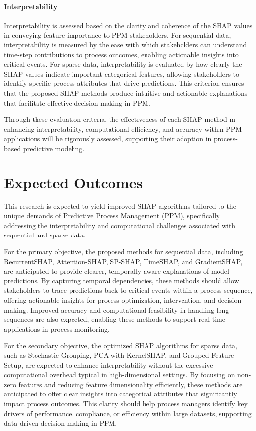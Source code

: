 \paragraph{Interpretability}
Interpretability is assessed based on the clarity and coherence of the SHAP values in conveying feature importance to PPM stakeholders. For sequential data, interpretability is measured by the ease with which stakeholders can understand time-step contributions to process outcomes, enabling actionable insights into critical events. For sparse data, interpretability is evaluated by how clearly the SHAP values indicate important categorical features, allowing stakeholders to identify specific process attributes that drive predictions. This criterion ensures that the proposed SHAP methods produce intuitive and actionable explanations that facilitate effective decision-making in PPM.

Through these evaluation criteria, the effectiveness of each SHAP method in enhancing interpretability, computational efficiency, and accuracy within PPM applications will be rigorously assessed, supporting their adoption in process-based predictive modeling.

\section{Expected Outcomes}

This research is expected to yield improved SHAP algorithms tailored to the unique demands of Predictive Process Management (PPM), specifically addressing the interpretability and computational challenges associated with sequential and sparse data.

For the primary objective, the proposed methods for sequential data, including RecurrentSHAP, Attention-SHAP, SP-SHAP, TimeSHAP, and GradientSHAP, are anticipated to provide clearer, temporally-aware explanations of model predictions. By capturing temporal dependencies, these methods should allow stakeholders to trace predictions back to critical events within a process sequence, offering actionable insights for process optimization, intervention, and decision-making. Improved accuracy and computational feasibility in handling long sequences are also expected, enabling these methods to support real-time applications in process monitoring.

For the secondary objective, the optimized SHAP algorithms for sparse data, such as Stochastic Grouping, PCA with KernelSHAP, and Grouped Feature Setup, are expected to enhance interpretability without the excessive computational overhead typical in high-dimensional settings. By focusing on non-zero features and reducing feature dimensionality efficiently, these methods are anticipated to offer clear insights into categorical attributes that significantly impact process outcomes. This clarity should help process managers identify key drivers of performance, compliance, or efficiency within large datasets, supporting data-driven decision-making in PPM.

